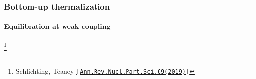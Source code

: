 \documentclass[aspectratio=169,11pt,usenames,dvipsnames]{beamer}
\renewcommand{\thefootnote}{$\star$}
\newcommand\blfootnote[1]{%
  \begingroup
  \renewcommand\thefootnote{}\footnote{#1}%
  \addtocounter{footnote}{-1}%
  \endgroup
}
\begin{document}

\begin{frame}
    \frametitle{Bottom-up thermalization}
    \framesubtitle{Equilibration at weak coupling}
    \blfootnote{\scriptsize Schlichting, Teaney \href{hhttps://doi.org/10.1146/annurev-nucl-101918-023825}{{\color{customblue}\texttt{[Ann.Rev.Nucl.Part.Sci.69(2019)]}}}}
\end{frame}
\end{document}
